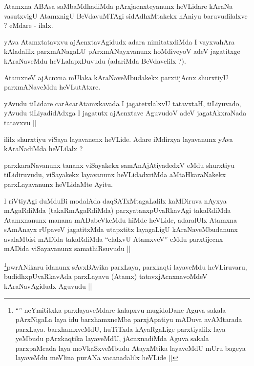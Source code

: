 \begin{artha}
Atamxna ABAsa saMbaMdhadiMda pArxjacnxteyanunx heVLidare kAraNa vasutxvigU AtamxnigU BeVdavuMTAgi sidAdhxMtakekx hAniyu baruvudilalxve ? eMdare - ilalx.
\end{artha}

\begin{artha}
yAva Atamxtatavxvu ajAcnxtavAgidudx adara nimitatxdiMda I vayxvahAra kAladalilx parxmANagaLU pArxmANayxvanunx hoMdiveyoV adeV jagatitxge kAraNaveMdu heVLalapxDuvudu (adariMda BeVdavelilx ?).
\end{artha}

\begin{artha}
AtamxneV ajAcnxna mUlaka kAraNaveMbudakekx parxtijAcnx shurxtiyU parxmANaveMdu heVLutAtxre.
\end{artha}

\begin{artha}
yAvudu tiLidare carAcarAtamxkavada I jagatetxlalxvU tatavxtaH, tiLiyuvado, yAvudu tiLiyadidAdxga I jagatutx ajAcnxtave AguvudoV adeV jagatAkxraNada tatavxvu ||
\end{artha}


\begin{artha}
ililx shurxtiyu viSaya layavanenx heVLide. Adare iMdirxya layavanunx yAva kAraNadiMda heVLilalx ?
\end{artha}


\begin{artha}
parxkaraNavanunx tananx viSayakekx samAnAjAtiyadedxV eMdu shurxtiyu tiLidiruvudu, viSayakekx layavanunx heVLidadxriMda aMtaHkaraNakekx parxLayavanunx heVLidaMte Ayitu.
\end{artha}


\begin{artha}
I riVtiyAgi duMduBi modalAda daqSATxMtagaLalilx kaMDiruva nAyxya mAgaRdiMda (takaRmAgaRdiMda) parxyatanxpUvaRkavAgi takaRdiMda Atamxnanunx manana mADabeVkeMdu hiMde heVLide, adaralUlx Atamxna sAmAnayx rUpaveV jagatitxMda utapxtitx layagaLigU kAraNaveMbudanunx avalaMbisi mADida takaRdiMda ``elalxvU AtamxveV'' eMdu parxtijecnx mADida viSayavanunx samathiRsuvudu ||
\end{artha}

\begin{artha}
\footnote[1]{``\stext'' neYmititxka parxlayaveMdare kalapxvu mugidoDane Aguva sakala pArxNigaLa laya idu barxhamxneMba parxjApatiyu mADuva avAMtarada parxLaya. barxhamxveMdU, huTiTxda kAyaRgaLige parxtiyalilx laya yeMbudu pArxkaqtika layaveMdU, jAcnxnadiMda Aguva sakala parxpaMcada laya moVkaSxveMbudu AtayxMtika layaveMdU mUru bageya layaveMdu meVlina purANa vacanadalilx heVLide ||}pwrANikaru idanunx sAvxBAvika parxLaya, parxkaqti layaveMdu heVLiruvaru, budidhxpUvaRkavAda parxLayavu (Atamx) tatavxjAcnxnavoMdeV kAraNavAgidudx Aguvudu ||
\end{artha}

